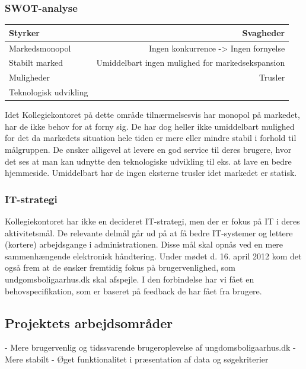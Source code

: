 \documentclass[12pt, a4paper]{report}
\begin{document}
\subsubsection{SWOT-analyse}
\begin{tabular}{ | l | r | }
\hline
Styrker & Svagheder \\ \hline
Markedsmonopol & Ingen konkurrence -> Ingen fornyelse \\
Stabilt marked & Umiddelbart ingen mulighed for markedsekspansion \\ \hline
Muligheder & Trusler \\
Teknologisk udvikling & \\
\hline
\end{tabular}
\newline
Idet Kollegiekontoret på dette område tilnærmelsesvis har monopol på markedet, har de ikke behov for at forny sig. De har dog heller ikke umiddelbart mulighed for det da markedets situation hele tiden er mere eller mindre stabil i forhold til målgruppen. De ønsker alligevel at levere en god service til deres brugere, hvor det ses at man kan udnytte den teknologiske udvikling til eks. at lave en bedre hjemmeside. Umiddelbart har de ingen eksterne trusler idet markedet er statisk.

  \subsubsection{IT-strategi}
Kollegiekontoret har ikke en decideret IT-strategi, men der er fokus på IT i deres aktivitetsmål. De relevante delmål går ud på at få bedre IT-systemer og lettere (kortere) arbejdsgange i administrationen. Disse mål skal opnås ved en mere sammenhængende elektronisk håndtering. Under mødet d. 16. april 2012 kom det også frem at de ønsker fremtidig fokus på brugervenlighed, som undgomsboligaarhus.dk skal afspejle. I den forbindelse har vi fået en behovspecifikation, som er baseret på feedback de har fået fra brugere.

  \subsection{Projektets arbejdsområder}
- Mere brugervenlig og tidssvarende brugeroplevelse af ungdomsboligaarhus.dk \newline
- Mere stabilt \newline
- Øget funktionalitet i præsentation af data og søgekriterier \newline
\end{document}
